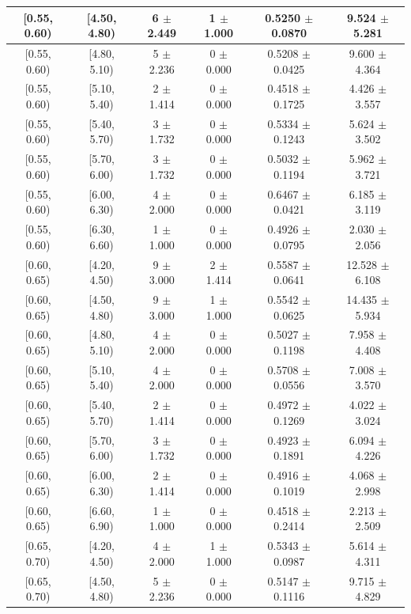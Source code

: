 \begin{longtable}{|c|c|c|c|c|c|}
\hline
[0.55, 0.60) & [4.50, 4.80) & 6 $\pm$ 2.449 & 1 $\pm$ 1.000 & 0.5250 $\pm$ 0.0870 & 9.524 $\pm$ 5.281 \\ 
\hline
[0.55, 0.60) & [4.80, 5.10) & 5 $\pm$ 2.236 & 0 $\pm$ 0.000 & 0.5208 $\pm$ 0.0425 & 9.600 $\pm$ 4.364 \\ 
\hline
[0.55, 0.60) & [5.10, 5.40) & 2 $\pm$ 1.414 & 0 $\pm$ 0.000 & 0.4518 $\pm$ 0.1725 & 4.426 $\pm$ 3.557 \\ 
\hline
[0.55, 0.60) & [5.40, 5.70) & 3 $\pm$ 1.732 & 0 $\pm$ 0.000 & 0.5334 $\pm$ 0.1243 & 5.624 $\pm$ 3.502 \\ 
\hline
[0.55, 0.60) & [5.70, 6.00) & 3 $\pm$ 1.732 & 0 $\pm$ 0.000 & 0.5032 $\pm$ 0.1194 & 5.962 $\pm$ 3.721 \\ 
\hline
[0.55, 0.60) & [6.00, 6.30) & 4 $\pm$ 2.000 & 0 $\pm$ 0.000 & 0.6467 $\pm$ 0.0421 & 6.185 $\pm$ 3.119 \\ 
\hline
[0.55, 0.60) & [6.30, 6.60) & 1 $\pm$ 1.000 & 0 $\pm$ 0.000 & 0.4926 $\pm$ 0.0795 & 2.030 $\pm$ 2.056 \\ 
\hline
[0.60, 0.65) & [4.20, 4.50) & 9 $\pm$ 3.000 & 2 $\pm$ 1.414 & 0.5587 $\pm$ 0.0641 & 12.528 $\pm$ 6.108 \\ 
\hline
[0.60, 0.65) & [4.50, 4.80) & 9 $\pm$ 3.000 & 1 $\pm$ 1.000 & 0.5542 $\pm$ 0.0625 & 14.435 $\pm$ 5.934 \\ 
\hline
[0.60, 0.65) & [4.80, 5.10) & 4 $\pm$ 2.000 & 0 $\pm$ 0.000 & 0.5027 $\pm$ 0.1198 & 7.958 $\pm$ 4.408 \\ 
\hline
[0.60, 0.65) & [5.10, 5.40) & 4 $\pm$ 2.000 & 0 $\pm$ 0.000 & 0.5708 $\pm$ 0.0556 & 7.008 $\pm$ 3.570 \\ 
\hline
[0.60, 0.65) & [5.40, 5.70) & 2 $\pm$ 1.414 & 0 $\pm$ 0.000 & 0.4972 $\pm$ 0.1269 & 4.022 $\pm$ 3.024 \\ 
\hline
[0.60, 0.65) & [5.70, 6.00) & 3 $\pm$ 1.732 & 0 $\pm$ 0.000 & 0.4923 $\pm$ 0.1891 & 6.094 $\pm$ 4.226 \\ 
\hline
[0.60, 0.65) & [6.00, 6.30) & 2 $\pm$ 1.414 & 0 $\pm$ 0.000 & 0.4916 $\pm$ 0.1019 & 4.068 $\pm$ 2.998 \\ 
\hline
[0.60, 0.65) & [6.60, 6.90) & 1 $\pm$ 1.000 & 0 $\pm$ 0.000 & 0.4518 $\pm$ 0.2414 & 2.213 $\pm$ 2.509 \\ 
\hline
[0.65, 0.70) & [4.20, 4.50) & 4 $\pm$ 2.000 & 1 $\pm$ 1.000 & 0.5343 $\pm$ 0.0987 & 5.614 $\pm$ 4.311 \\ 
\hline
[0.65, 0.70) & [4.50, 4.80) & 5 $\pm$ 2.236 & 0 $\pm$ 0.000 & 0.5147 $\pm$ 0.1116 & 9.715 $\pm$ 4.829 \\ 

\end{longtable}

